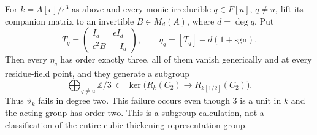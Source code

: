 \begin{theorem}
\label{C:cubic_three_torsion}
For $k=A[\epsilon]/\epsilon^3$ as above and every monic
irreducible $q\in F[u]$, $q\ne u$, lift its companion matrix
to an invertible $B\in M_d(A)$, where $d=\deg q$. Put
\[
 T_q=\begin{pmatrix}I_d&\epsilon I_d\\
                     \epsilon^2B&-I_d\end{pmatrix},
 \qquad\eta_q=[T_q]-d(1+\mathrm{sgn}).                  \tag{C.1.23}
\]
Then every $\eta_q$ has order exactly three, all of them vanish
generically and at every residue-field point, and they generate
a subgroup
\[
 \bigoplus_{q\ne u}\mathbb Z/3
 \ \subset\ \ker\bigl(R_k(C_2)\longrightarrow R_{k[1/2]}(C_2)\bigr).
                                                               \tag{C.1.24}
\]
Thus $\vartheta_k$ fails in degree two. This failure occurs even
though $3$ is a unit in $k$ and the acting group has order two.
This is a subgroup calculation, not a classification of the
entire cubic-thickening representation group.
\end{theorem}
